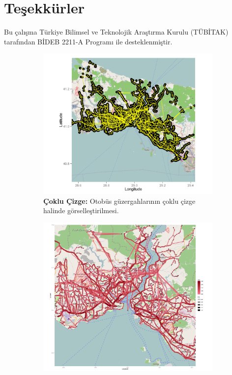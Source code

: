 \documentclass[10pt,a4paper,twocolumn]{article}
\begin{document}
\section*{Teşekkürler}
\paragraph{} Bu çalışma Türkiye Bilimsel ve Teknolojik Araştırma Kurulu (TÜBİTAK) tarafından BİDEB 2211-A Programı ile desteklenmiştir.


%
 


\clearpage
\onecolumn
\begin{figure}
\begin{subfigure}{.5\textwidth}
  \includegraphics[width=\linewidth]{img/map1-multigraph.png}
  \caption{\textbf{Çoklu Çizge:} Otobüs güzergahlarının çoklu çizge halinde görselleştirilmesi. }
  \label{fig:multigraph}  
\end{subfigure}
\begin{subfigure}{.45\textwidth}
 \hspace{0.1mm}
  \includegraphics[width=\linewidth]{img/map2-weighted-network.png}

\end{subfigure}
\end{figure}
\end{document}
